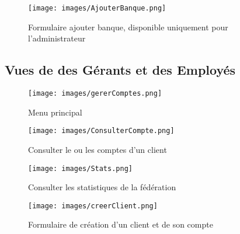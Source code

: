 {\begin{figure}[H]
\begin{center}
\end{center}
\end{figure}

\begin{figure}[H]
\begin{center}

   \caption{\label{} Formulaire ajouter banque, disponible uniquement pour l'administrateur}
   \texttt{[image: images/AjouterBanque.png]}
   \centering
 \end{center}
\end{figure}

 \subsection{Vues de des Gérants et des Employés}

\begin{figure}[H]
\begin{center}

   \caption{\label{} Menu principal}
   \texttt{[image: images/gererComptes.png]}
   \centering
 \end{center}
\end{figure}

\begin{figure}[H]
\begin{center}

   \caption{\label{} Consulter le ou les comptes d'un client}
   \texttt{[image: images/ConsulterCompte.png]}
   \centering
 \end{center}
\end{figure}

\begin{figure}[H]
\begin{center}

   \caption{\label{} Consulter les statistiques de la fédération}
   \texttt{[image: images/Stats.png]}
   \centering
 \end{center}
\end{figure}

\begin{figure}[H]
\begin{center}

   \caption{\label{} Formulaire de création d'un client et de son compte}
   \texttt{[image: images/creerClient.png]}
   \centering
 \end{center}
\end{figure}

\begin{figure}[H]
\begin{center}


\end{center}
\end{figure}}
